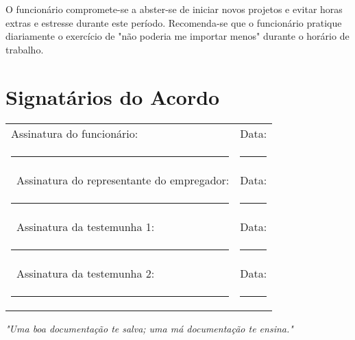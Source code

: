 \documentclass[a4paper,11pt]{article}
\begin{document}
O funcionário compromete-se a abster-se de iniciar novos projetos e evitar horas extras e estresse durante este período. Recomenda-se que o funcionário pratique diariamente o exercício de "não poderia me importar menos" durante o horário de trabalho.

\section*{Signatários do Acordo}

\vspace{2em}
\noindent\begin{tabular}{@{}p{8cm}p{8cm}@{}}
Assinatura do funcionário: & Data: \\
\rule{8cm}{0.4pt} & \rule{8cm}{0.4pt} \\\
Assinatura do representante do empregador: & Data: \\
\rule{8cm}{0.4pt} & \rule{8cm}{0.4pt} \\\
Assinatura da testemunha 1: & Data: \\
\rule{8cm}{0.4pt} & \rule{8cm}{0.4pt} \\\
Assinatura da testemunha 2: & Data: \\
\rule{8cm}{0.4pt} & \rule{8cm}{0.4pt}
\end{tabular}

\vfill

\begin{center}
    \textit{"Uma boa documentação te salva; uma má documentação te ensina."}
\end{center}
\end{document}
